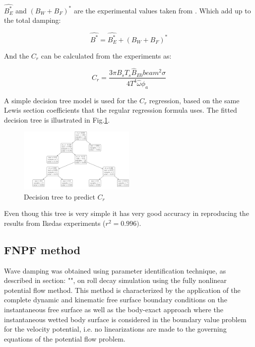     $\hat{B_E^*}$ and $(B_W+B_F)^*$ are the experimental values taken
from \citep{7505983/4AFVVGNT}. Which add up to the total damping:

    \[\hat{B^*} = \hat{B^*_E} + (B_W+B_F)^*\]

    And the $C_r$ can be calculated from the experiments as:
 
            
    
    \begin{equation}
C_{r} = \frac{3 \pi B_{s} T_{s} \hat{B}_{E0} beam^{2} \sigma}{4 T^{4} \hat{\omega} \phi_{a}}
\label{eq:C_r_2}
\end{equation}

    

    A simple decision tree model is used for the $C_r$ regression, based
on the same Lewis section coefficients that the regular regression
formula uses. The fitted decision tree is illustrated in
Fig.\ref{fig:decision_tree}.

    

    \begin{figure}[H]
        \begin{center}\includegraphics[width = 0.5\textwidth]{figures/decision_tree.pdf}\end{center}
        \vspace{-1cm}
        \caption{Decision tree to predict $C_r$}
        \label{fig:decision_tree}
    \end{figure}
    
    Even thoug this tree is very simple it has very good accuracy in
reproducing the results from Ikedas experiments ($r^2=0.996)$.

    \subsection*{FNPF method}\label{fnpf-method}

\label{fnpf-method} Wave damping was obtained using parameter
identification technique, as described in section:
"", on roll decay simulation using the fully
nonlinear potential flow method. This method is characterized by the
application of the complete dynamic and kinematic free surface boundary
conditions on the instantaneous free surface as well as the body-exact
approach where the instantaneous wetted body surface is considered in
the boundary value problem for the velocity potential, i.e. no
linearizations are made to the governing equations of the potential flow
problem.

